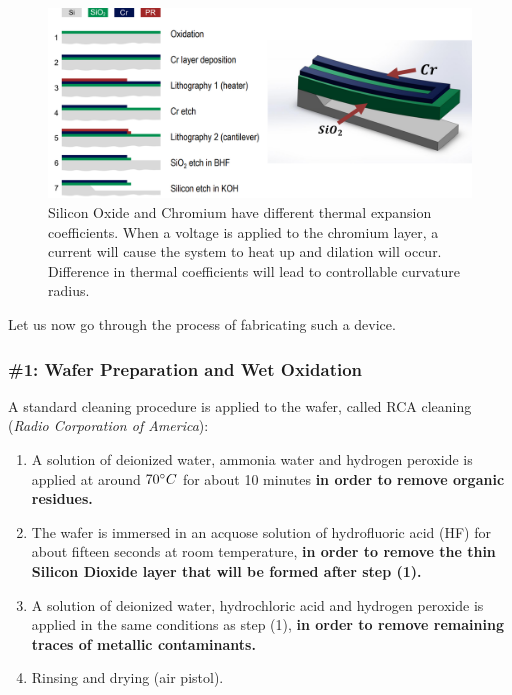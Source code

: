 \documentclass[12pt,a4paper]{report}
\begin{document}
\begin{figure}[H]
    \centering
    \includegraphics[width=1\linewidth]{micro actuator.png}
    \caption{Silicon Oxide and Chromium have different thermal expansion coefficients. When a voltage is applied to the chromium layer, a current will cause the system to heat up and dilation will occur. Difference in thermal coefficients will lead to controllable curvature radius.}
    \label{micro actuator procedure}
\end{figure}

Let us now go through the process of fabricating such a device.

\subsubsection{\#1: Wafer Preparation and Wet Oxidation}

A standard cleaning procedure is applied to the wafer, called RCA cleaning (\textit{Radio Corporation of America}):

\begin{enumerate}
    \item A solution of deionized water, ammonia water and hydrogen peroxide is applied at around $70\degree C$ for about 10 minutes \textbf{in order to remove organic residues.}
    \item The wafer is immersed in an acquose solution of hydrofluoric acid (HF) for about fifteen seconds at room temperature, \textbf{in order to remove the thin Silicon Dioxide layer that will be formed after step (1).}
    \item A solution of deionized water, hydrochloric acid and hydrogen peroxide is applied in the same conditions as step (1), \textbf{in order to remove remaining traces of metallic contaminants.}
    \item Rinsing and drying (air pistol).
\end{enumerate}
\end{document}
